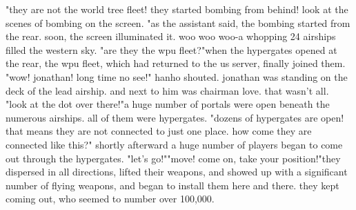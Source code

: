 "they are not the world tree fleet! they started bombing from behind! look at the scenes of bombing on the screen.
"as the assistant said, the bombing started from the rear.
 soon, the screen illuminated it.
woo woo woo-a whopping 24 airships filled the western sky.
"are they the wpu fleet?"when the hypergates opened at the rear, the wpu fleet, which had returned to the us server, finally joined them.
"wow! jonathan! long time no see!" hanho shouted.
jonathan was standing on the deck of the lead airship.
 and next to him was chairman love.
 that wasn't all.
"look at the dot over there!"a huge number of portals were open beneath the numerous airships.
 all of them were hypergates.
"dozens of hypergates are open! that means they are not connected to just one place.
 how come they are connected like this?" shortly afterward a huge number of players began to come out through the hypergates.
"let's go!""move! come on, take your position!"they dispersed in all directions, lifted their weapons, and showed up with a significant number of flying weapons, and began to install them here and there.
they kept coming out, who seemed to number over 100,000.


 